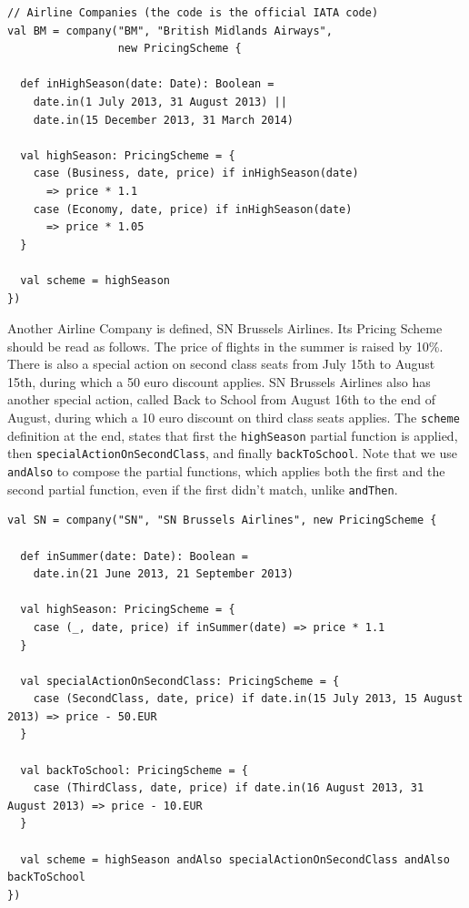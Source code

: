 \documentclass[a4paper]{article}
\newcommand{\cc}[1]{\texttt{#1}}
\renewcommand{\sc}[1]{\lstinline{#1}}
\begin{document}
\begin{lstlisting}
// Airline Companies (the code is the official IATA code)
val BM = company("BM", "British Midlands Airways",
                 new PricingScheme {

  def inHighSeason(date: Date): Boolean =
    date.in(1 July 2013, 31 August 2013) ||
    date.in(15 December 2013, 31 March 2014)

  val highSeason: PricingScheme = {
    case (Business, date, price) if inHighSeason(date)
      => price * 1.1
    case (Economy, date, price) if inHighSeason(date)
      => price * 1.05
  }

  val scheme = highSeason
})
\end{lstlisting}

Another Airline Company is defined, SN Brussels Airlines.
Its Pricing Scheme should be read as follows.
The price of flights in the summer is raised by 10\%.
There is also a special action on second class seats from July 15th to August 15th, during which a 50 euro discount applies.
SN Brussels Airlines also has another special action, called Back to School from August 16th to the end of August, during which a 10 euro discount on third class seats applies.
The \sc{scheme} definition at the end, states that first the \cc{highSeason} partial function is applied, then \cc{special\-Action\-On\-Second\-Class}, and finally \cc{backToSchool}.
Note that we use \sc{andAlso} to compose the partial functions, which applies both the first and the second partial function, even if the first didn't match, unlike \sc{andThen}.

\begin{lstlisting}
val SN = company("SN", "SN Brussels Airlines", new PricingScheme {

  def inSummer(date: Date): Boolean =
    date.in(21 June 2013, 21 September 2013)

  val highSeason: PricingScheme = {
    case (_, date, price) if inSummer(date) => price * 1.1
  }

  val specialActionOnSecondClass: PricingScheme = {
    case (SecondClass, date, price) if date.in(15 July 2013, 15 August 2013) => price - 50.EUR
  }

  val backToSchool: PricingScheme = {
    case (ThirdClass, date, price) if date.in(16 August 2013, 31 August 2013) => price - 10.EUR
  }

  val scheme = highSeason andAlso specialActionOnSecondClass andAlso backToSchool
})
\end{lstlisting}
\end{document}
